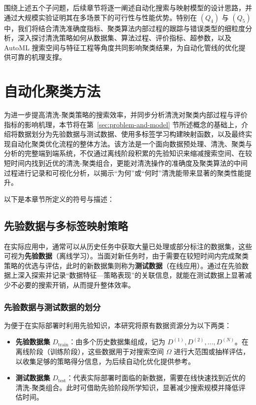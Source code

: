 \documentclass[10pt]{article} %
\numberwithin{equation}{section}
\begin{document}
围绕上述五个子问题，后续章节将逐一阐述自动化搜索与映射模型的设计思路，并通过大规模实验证明其在多场景下的可行性与性能优势。特别在 \((Q_4)\) 与 \((Q_5)\) 中，我们将结合清洗准确度指标、聚类算法内部过程的跟踪与错误类型的细粒度分析，深入探讨清洗策略如何从数据集、算法过程、评价指标、超参数，以及 AutoML 搜索空间与特征工程等角度共同影响聚类结果，为自动化管线的优化提供可靠的机理支撑。


\section{自动化聚类方法}
\label{sec:autoML}

为进一步提高清洗-聚类策略的搜索效率，并同步分析清洗对聚类内部过程与评价指标的影响机理，本节将在第~\ref{sec:problem-and-model} 节所述概念的基础上，介绍将数据划分为先验数据与测试数据、使用多标签学习构建映射函数，以及最终实现自动化聚类优化流程的整体方法。该方法是一个面向数据预处理、清洗、聚类与分析的完整端到端系统，不仅通过离线阶段积累的先验知识来缩减搜索空间、在较短时间内找到近优的清洗-聚类组合，更能对清洗操作的准确度及聚类算法的中间过程进行记录和可视化分析，以揭示“为何”或“何时”清洗能带来显著的聚类性能提升。

以下是本章节所定义的符号与描述：

\subsection{先验数据与多标签映射策略}
\label{sec:prior-data-mapping}

在实际应用中，通常可以从历史任务中获取大量已处理或部分标注的数据集，这些可视为\textbf{先验数据}（离线学习）。当面对新任务时，由于需要在较短时间内完成聚类策略的优选与评估，此时的新数据集则称为\textbf{测试数据}（在线应用）。通过在先验数据上深入探索并记录“数据特征—策略表现”的关联信息，就能在测试数据上显著减少不必要的搜索开销，从而提升整体效率。

\subsubsection{先验数据与测试数据的划分}
\label{subsec:dataset-split}

为便于在实际部署时利用先验知识，本研究将原有数据资源分为以下两类：
\begin{itemize}
    \item \textbf{先验数据集} $D_{\text{train}}$：由多个历史数据集组成，记为 ${D^{(1)}, D^{(2)}, \dots, D^{(N)}}$。在离线阶段（训练阶段），这些数据用于对搜索空间 $\Omega$ 进行大范围或抽样评估，以收集足够的策略得分信息，为后续自动化优化提供参考。
    \item \textbf{测试数据集} $D_{\text{test}}$：代表实际部署时面临的新数据，需要在线快速找到近优的清洗-聚类组合。此时可借助先验阶段所学知识，显著减少搜索规模并降低评估时间。
\end{itemize}
\end{document}
